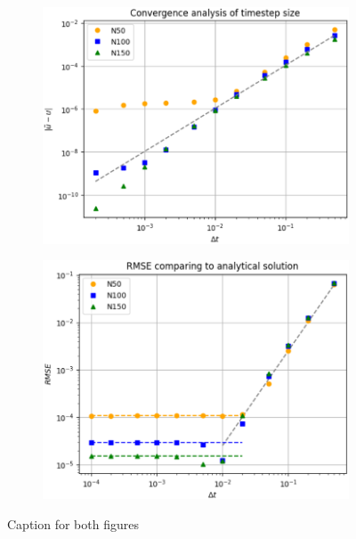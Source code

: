 \documentclass[
  english,        %
  font=times,     %
  onecolumn,      %
]{tumarticle}
\begin{document}
\begin{figure}[!htbp]
    \centering
    \begin{subfigure}[b]{0.49\textwidth}
      \includegraphics[width=\textwidth]{resources/convergence_study_openfoam.png}
      \caption{}
      \label{fig:convergence_openfoam}
    \end{subfigure}
    \hspace{1pt}
    \begin{subfigure}[b]{0.49\textwidth}
      \includegraphics[width=\textwidth]{resources/RMSE_study.png}
      \caption{}
      \label{fig:RMSE_openfoam}
    \end{subfigure}
    \caption{Caption for both figures}
    \label{fig:figures}
  \end{figure}
  
\end{document}
